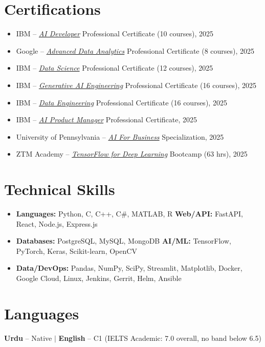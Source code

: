 \documentclass[11pt,a4paper]{article}
\begin{document}
\section*{Certifications}
\begin{itemize}
    \item IBM -- \href{https://www.coursera.org/account/accomplishments/professional-cert/AUXO12A3KUE7}{\textit{AI Developer}} Professional Certificate (10 courses), 2025
    \item Google -- \href{https://www.coursera.org/account/accomplishments/professional-cert/RS5PNGTXG6GM}{\textit{Advanced Data Analytics}} Professional Certificate (8 courses), 2025
    \item IBM -- \href{https://www.coursera.org/account/accomplishments/professional-cert/YW8F4AT9VNBD}{\textit{Data Science}} Professional Certificate (12 courses), 2025
    \item IBM -- \href{https://www.coursera.org/account/accomplishments/professional-cert/55VL0VUWMJYK}{\textit{Generative AI Engineering}} Professional Certificate (16 courses), 2025
    \item IBM -- \href{https://www.coursera.org/account/accomplishments/professional-cert/IRVGNYDPKGG4}{\textit{Data Engineering}} Professional Certificate (16 courses), 2025
    \item IBM -- \href{https://www.coursera.org/account/accomplishments/professional-cert/5B224YFNDQF3}{\textit{AI Product Manager}} Professional Certificate, 2025
    \item University of Pennsylvania -- \href{https://www.coursera.org/account/accomplishments/specialization/JJ0I3RVGIP70}{\textit{AI For Business}} Specialization, 2025
    \item ZTM Academy -- \href{https://www.udemy.com/certificate/UC-80e47528-e137-4eaf-ba36-501e0a499f72/}{\textit{TensorFlow for Deep Learning}} Bootcamp (63 hrs), 2025
\end{itemize}

\section*{Technical Skills}
\begin{itemize}
    \item \textbf{Languages:} Python, C, C++, C\#, MATLAB, R \quad \textbf{Web/API:} FastAPI, React, Node.js, Express.js
    \item \textbf{Databases:} PostgreSQL, MySQL, MongoDB \quad \textbf{AI/ML:} TensorFlow, PyTorch, Keras, Scikit-learn, OpenCV
    \item \textbf{Data/DevOps:} Pandas, NumPy, SciPy, Streamlit, Matplotlib, Docker, Google Cloud, Linux, Jenkins, Gerrit, Helm, Ansible
\end{itemize}

\section*{Languages}
\textbf{Urdu} -- Native \quad $\vert$ \quad \textbf{English} -- C1 (IELTS Academic: 7.0 overall,
no band below 6.5)
\end{document}
